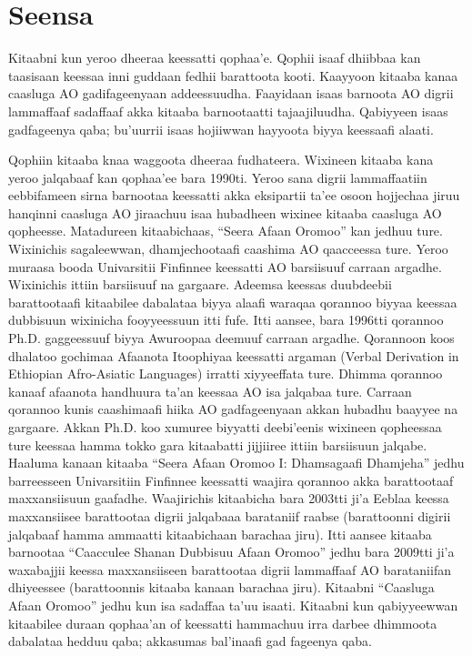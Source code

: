 \documentclass[11pt,b5paper]{book}
\begin{document}
\chapter{Seensa}
\setlength{\parindent}{3em}

Kitaabni kun yeroo dheeraa keessatti qophaa’e. Qophii isaaf dhiibbaa kan taasisaan keessaa inni guddaan fedhii barattoota kooti. Kaayyoon kitaaba kanaa caasluga AO gadifageenyaan
addeessuudha. Faayidaan isaas barnoota AO digrii lammaffaaf sadaffaaf akka kitaaba barnootaatti tajaajiluudha. Qabiyyeen isaas gadfageenya qaba; bu’uurrii isaas hojiiwwan hayyoota
biyya keessaafi alaati.

Qophiin kitaaba knaa waggoota dheeraa fudhateera. Wixineen kitaaba kana yeroo jalqabaaf kan qophaa’ee bara 1990ti. Yeroo sana digrii lammaffaatiin eebbifameen sirna
barnootaa keessatti akka eksipartii ta’ee osoon hojjechaa jiruu hanqinni caasluga AO jiraachuu isaa hubadheen wixinee kitaaba caasluga AO qopheesse. Matadureen kitaabichaas,
“Seera Afaan Oromoo” kan jedhuu ture. Wixinichis sagaleewwan, dhamjechootaafi caashima AO qaacceessa ture. Yeroo muraasa booda Univarsitii Finfinnee keessatti AO
barsiisuuf carraan argadhe. Wixinichis ittiin barsiisuuf na gargaare. Adeemsa keessas duubdeebii barattootaafi kitaabilee dabalataa biyya alaafi waraqaa qorannoo biyyaa
keessaa dubbisuun wixinicha fooyyeessuun itti fufe. Itti aansee, bara 1996tti qorannoo Ph.D. gaggeessuuf biyya Awuroopaa deemuuf carraan argadhe. Qorannoon koos dhalatoo
gochimaa Afaanota Itoophiyaa keessatti argaman (Verbal Derivation in Ethiopian Afro-Asiatic Languages) irratti xiyyeeffata ture. Dhimma qorannoo kanaaf afaanota handhuura ta’an keessaa AO isa jalqabaa ture. Carraan qorannoo kunis caashimaafi hiika AO gadfageenyaan akkan hubadhu baayyee na gargaare. Akkan Ph.D. koo xumuree biyyatti deebi’eenis wixineen qopheessaa ture keessaa hamma tokko gara kitaabatti jijjiiree ittiin barsiisuun jalqabe. Haaluma kanaan kitaaba “Seera Afaan Oromoo I: Dhamsagaafi Dhamjeha” jedhu barreesseen Univarsitiin Finfinnee keessatti waajira qorannoo akka barattootaaf maxxansiisuun gaafadhe. Waajirichis kitaabicha bara 2003tti ji’a Eeblaa keessa maxxansiisee barattootaa digrii jalqabaaa barataniif raabse
(barattoonni digirii jalqabaaf hamma ammaatti kitaabichaan barachaa jiru). Itti aansee kitaaba barnootaa “Caacculee Shanan Dubbisuu Afaan Oromoo” jedhu bara 2009tti ji’a
waxabajjii keessa maxxansiiseen barattootaa digrii lammaffaaf AO barataniifan dhiyeessee (barattoonnis kitaaba kanaan barachaa jiru). Kitaabni “Caasluga Afaan Oromoo” jedhu kun
isa sadaffaa ta’uu isaati. Kitaabni kun qabiyyeewwan kitaabilee duraan qophaa’an of keessatti hammachuu irra darbee dhimmoota dabalataa hedduu qaba; akkasumas bal’inaafi gad
fageenya qaba.
\end{document}
